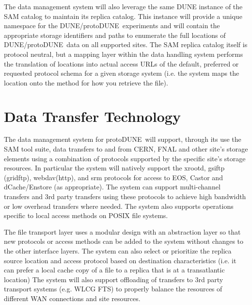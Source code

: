 \documentclass[pdftex,12pt,letter]{article}
\newcommand{\pd}{protoDUNE\ }
\begin{document}
The data management system will also leverage the same DUNE instance of the SAM catalog to maintain its replica catalog.  This instance will provide a unique namespace for the DUNE/\pd experiments and will contain the appropriate storage identifiers and paths to enumerate the full locations of  DUNE/\pd data on all supported sites.  The SAM replica catalog itself is protocol neutral, but a mapping layer within the data handling system performs the translation of locations into actual access URLs of the default, preferred or requested protocol schema for a given storage system (i.e. the system maps the location onto the method for how you retrieve the file).

\section{Data Transfer Technology}

The data management system for \pd will support, through its use the SAM tool suite,  data transfers to and from CERN, FNAL and other site’s storage elements using a combination of protocols supported by the specific site’s storage resources.  In particular the system will natively support the xrootd, gsiftp (gridftp), webdav(http), and srm protocols for access to EOS, Castor and dCache/Enstore (as appropriate).  The system can support multi-channel transfers and 3rd party transfers using these protocols to achieve high bandwidth or low overhead transfers where needed.  The system also supports operations specific to local access methods on POSIX file systems.  

The file transport layer uses a modular design with an abstraction layer so that new protocols or access methods can be added to the system without changes to the other interface layers.  The system can also select or prioritize the replica source location and access protocol based on destination characteristics (i.e. it can prefer a local cache copy of a file to a replica that is at a transatlantic location)  The system will also support offloading of transfers to 3rd party transport systems (e.g. WLCG FTS) to properly balance the resources of different WAN connections and site resources.
\end{document}
